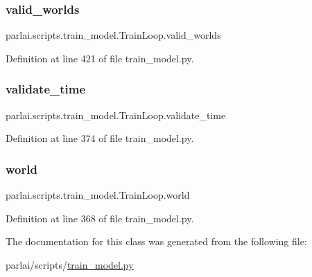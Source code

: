 \subsubsection{\texorpdfstring{valid\+\_\+worlds}{valid\_worlds}}
{\footnotesize\ttfamily parlai.\+scripts.\+train\+\_\+model.\+Train\+Loop.\+valid\+\_\+worlds}



Definition at line 421 of file train\+\_\+model.\+py.

\mbox{\label{classparlai_1_1scripts_1_1train__model_1_1TrainLoop_ac7752245b67836fbcf9469a6247a14a2}} 
\subsubsection{\texorpdfstring{validate\+\_\+time}{validate\_time}}
{\footnotesize\ttfamily parlai.\+scripts.\+train\+\_\+model.\+Train\+Loop.\+validate\+\_\+time}



Definition at line 374 of file train\+\_\+model.\+py.

\mbox{\label{classparlai_1_1scripts_1_1train__model_1_1TrainLoop_aa22c430edd5956591bd0d266f0984ebb}} 
\subsubsection{\texorpdfstring{world}{world}}
{\footnotesize\ttfamily parlai.\+scripts.\+train\+\_\+model.\+Train\+Loop.\+world}



Definition at line 368 of file train\+\_\+model.\+py.



The documentation for this class was generated from the following file\+:\begin{DoxyCompactItemize}
\item 
parlai/scripts/\hyperlink{parlai_2scripts_2train__model_8py}{train\+\_\+model.\+py}\end{DoxyCompactItemize}
